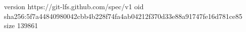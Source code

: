 version https://git-lfs.github.com/spec/v1
oid sha256:5f7a44840980042cbb4b228f74fa4ab04212f370d33e88a91747fe16d781ce85
size 139861
